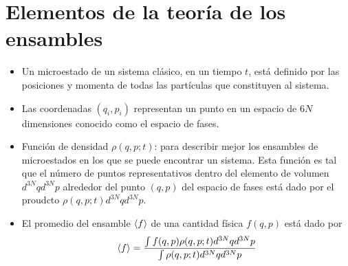 \section{Elementos de la teoría de los ensambles}
\begin{itemize}
	\item Un microestado de un sistema clásico, en un tiempo $t$, está
	definido por las posiciones y momenta de todas las partículas
	que constituyen al sistema.
	\item Las coordenadas $(q_i,p_i)$ representan un punto en 
	un espacio de $6N$ dimensiones conocido como el espacio de fases.
	\item Función de densidad $\rho(q,p;t)$: para describir mejor 
	los ensambles de microestados en los que se puede encontrar
	un sistema. Esta función es tal que el número de puntos 
	representativos dentro del elemento de volumen $d^{3N}qd^{3N}p$
	alrededor del punto $(q,p)$ del espacio de fases está dado por 
	el proudcto $\rho(q,p;t)d^{3N}qd^{3N}p$.
	\item El promedio del ensamble $\expval{f}$ de una cantidad
	física $f(q,p)$ está dado por 
	\begin{align}
	\expval{f}=
	\frac{\int f(q,p)\rho(q,p;t)d^{3N}qd^{3N}p}{\int \rho(q,p;t)d^{3N}qd^{3N}p}
	\end{align}
	

\end{itemize}
